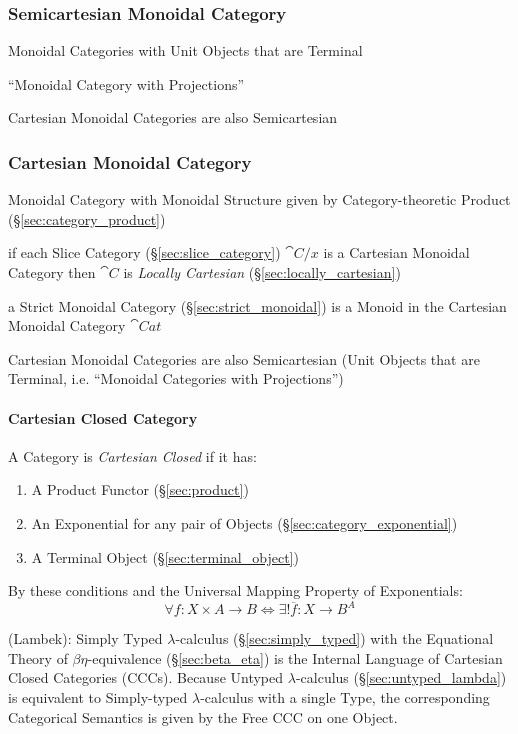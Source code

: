 \subsubsection{Semicartesian Monoidal Category}
\label{sec:semicartesian_monoidal}

Monoidal Categories with Unit Objects that are Terminal

``Monoidal Category with Projections''

Cartesian Monoidal Categories are also Semicartesian



\subsubsection{Cartesian Monoidal Category}\label{sec:cartesian_monoidal}

Monoidal Category with Monoidal Structure given by Category-theoretic Product
(\S\ref{sec:category_product})

if each Slice Category (\S\ref{sec:slice_category}) $\cat{C}/x$ is a
Cartesian Monoidal Category then $\cat{C}$ is \emph{Locally Cartesian}
(\S\ref{sec:locally_cartesian})

a Strict Monoidal Category (\S\ref{sec:strict_monoidal}) is a Monoid
in the Cartesian Monoidal Category $\cat{Cat}$

Cartesian Monoidal Categories are also Semicartesian (Unit Objects
that are Terminal, i.e. ``Monoidal Categories with Projections'')



\paragraph{Cartesian Closed Category}\label{sec:cartesian_closed}\hfill

A Category is \emph{Cartesian Closed} if it has:
\begin{enumerate}
  \item A Product Functor (\S\ref{sec:product})
  \item An Exponential for any pair of Objects
    (\S\ref{sec:category_exponential})
  \item A Terminal Object (\S\ref{sec:terminal_object})
\end{enumerate}
By these conditions and the Universal Mapping Property of
Exponentials:
\[
  \forall f : X \times A \rightarrow B \Leftrightarrow
  \exists ! \overline{f} : X \rightarrow B^A
\]

(Lambek): Simply Typed $\lambda$-calculus (\S\ref{sec:simply_typed}) with the
Equational Theory of $\beta\eta$-equivalence (\S\ref{sec:beta_eta}) is the
Internal Language of Cartesian Closed Categories (CCCs). Because Untyped
$\lambda$-calculus (\S\ref{sec:untyped_lambda}) is equivalent to Simply-typed
$\lambda$-calculus with a single Type, the corresponding Categorical Semantics
is given by the Free CCC on one Object.

